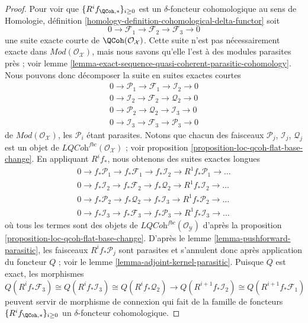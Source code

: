 \begin{proof}
\medskip\noindent
Pour voir que $\{R^if_{\QCoh, *}\}_{i \geq 0}$ est un
$\delta$-foncteur cohomologique au sens de
Homologie, définition \ref{homology-definition-cohomological-delta-functor}
soit
$$
0 \to \mathcal{F}_1 \to \mathcal{F}_2 \to \mathcal{F}_3 \to 0
$$
une suite exacte courte de $\QCoh(\mathcal{O}_\mathcal{X})$.
Cette suite n'est pas nécessairement exacte dans
$\textit{Mod}(\mathcal{O}_\mathcal{X})$, mais nous savons qu'elle l'est
à des modules parasites près ; voir
lemme \ref{lemma-exact-sequence-quasi-coherent-parasitic-cohomology}.
Nous pouvons donc décomposer la suite en suites exactes courtes
$$
\begin{matrix}
0 \to \mathcal{P}_1 \to \mathcal{F}_1 \to \mathcal{I}_2 \to 0 \\
0 \to \mathcal{I}_2 \to \mathcal{F}_2 \to \mathcal{Q}_2 \to 0 \\
0 \to \mathcal{P}_2 \to \mathcal{Q}_2 \to \mathcal{I}_3 \to 0 \\
0 \to \mathcal{I}_3 \to \mathcal{F}_3 \to \mathcal{P}_3 \to 0
\end{matrix}
$$
de $\textit{Mod}(\mathcal{O}_\mathcal{X})$, les $\mathcal{P}_i$ étant parasites.
Notons que chacun des faisceaux
$\mathcal{P}_j$, $\mathcal{I}_j$, $\mathcal{Q}_j$ est un objet de
$\textit{LQCoh}^{fbc}(\mathcal{O}_\mathcal{X})$ ; voir
proposition \ref{proposition-loc-qcoh-flat-base-change}.
En appliquant $R^if_*$, nous obtenons des suites exactes longues
$$
\begin{matrix}
0 \to f_*\mathcal{P}_1 \to f_*\mathcal{F}_1 \to f_*\mathcal{I}_2 \to
R^1f_*\mathcal{P}_1 \to \ldots \\
0 \to f_*\mathcal{I}_2 \to f_*\mathcal{F}_2 \to f_*\mathcal{Q}_2 \to
R^1f_*\mathcal{I}_2 \to \ldots \\
0 \to f_*\mathcal{P}_2 \to f_*\mathcal{Q}_2 \to f_*\mathcal{I}_3 \to
R^1f_*\mathcal{P}_2 \to \ldots \\
0 \to f_*\mathcal{I}_3 \to f_*\mathcal{F}_3 \to f_*\mathcal{P}_3 \to
R^1f_*\mathcal{I}_3 \to \ldots
\end{matrix}
$$
où tous les termes sont des objets de
$\textit{LQCoh}^{fbc}(\mathcal{O}_\mathcal{Y})$ d'après la
proposition \ref{proposition-loc-qcoh-flat-base-change}.
D'après le
lemme \ref{lemma-pushforward-parasitic},
les faisceaux $R^if_*\mathcal{P}_j$ sont parasites et s'annulent donc après application
du foncteur $Q$ ; voir le
lemme \ref{lemma-adjoint-kernel-parasitic}.
Puisque $Q$ est exact, les morphismes
$$
Q(R^if_*\mathcal{F}_3)
\cong
Q(R^if_*\mathcal{I}_3)
\cong
Q(R^if_*\mathcal{Q}_2)
\rightarrow
Q(R^{i + 1}f_*\mathcal{I}_2)
\cong
Q(R^{i + 1}f_*\mathcal{F}_1)
$$
peuvent servir de morphisme de connexion qui fait de la famille de foncteurs
$\{R^if_{\QCoh, *}\}_{i \geq 0}$
un $\delta$-foncteur cohomologique.
\end{proof}

